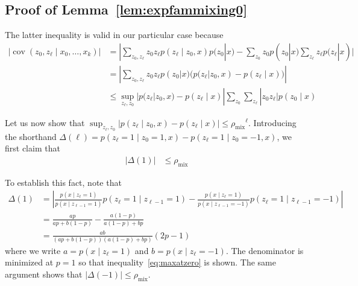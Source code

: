 \documentclass[twoside,11pt]{article}
\DeclareMathOperator{\cov}{cov}
\newcommand{\mixcoef}{\ensuremath{\rho_{\mathrm{mix}}}}
\begin{document}

\subsection{Proof of Lemma~\ref{lem:expfammixing0}}
\label{sec:expfammixing}


The latter inequality is valid in our particular case because
\begin{align*}
|\cov (z_0, z_{\ell} \mid x_0,\dots, x_k)| &= |\sum_{z_0, z_{\ell}}
z_0 z_{\ell} p(z_{\ell} \mid z_0,x) p(z_0|x) - \sum_{z_0} z_0 p(z_0|x)
\sum_{z_{\ell}} z_{\ell} p(z_{\ell}|x)| \\
%
&= | \sum_{z_0, z_{\ell}} z_0 z_{\ell} p(z_0|x) (p(z_{\ell}|z_0,x) -
p(z_{\ell} \mid x))| \\ 
%
& \leq \sup_{z_{\ell},z_0} |p(z_{\ell}|z_0,x) - p(z_{\ell} \mid x)|
\sum_{z_0} \sum_{z_{\ell}} |z_0 z_{\ell}| p(z_0 \mid x)
\end{align*}

Let us now show that $\sup_{z_{\ell},z_0} \big| p(z_{\ell} \mid z_0,x)
- p(z_{\ell} \mid x) \big| \leq \mixcoef^{\ell}$.  Introducing the
shorthand $\Delta(\ell) = p(z_{\ell} = 1 \mid z_{0} = 1, x) -
p(z_{\ell} = 1 \mid z_0 =-1, x)$, we first claim that
\begin{align}
\label{eq:maxatzero} 
|\Delta(1)| & \leq \mixcoef
\end{align}

To establish this fact, note that 
\begin{align*}
\Delta(1) & = \left| \frac{p(x \mid z_{\ell} =1) }{p(x
  \mid z_{\ell-1}=1)} p(z_{\ell} =1 \mid z_{\ell-1}=1) -
\frac{p(x \mid z_{\ell}=1)}{p(x \mid z_{\ell-1}= -1)}
p(z_{\ell} = 1 \mid z_{\ell-1} = -1) \right| \\
%
& = \frac{ap}{ap + b(1-p)} -\frac{a(1-p)}{a(1-p)+bp} \\
%
& = \frac{ab}{(ap + b(1-p))(a(1-p)+bp)} (2p-1)
\end{align*}
where we write $a = p( x \mid z_{\ell}=1)$ and $b = p(x \mid z_{\ell}= -1)$.
The denominator is minimized at $p=1$ so that
inequality~\eqref{eq:maxatzero} is shown.  The same argument shows
that $|\Delta(-1)| \leq \mixcoef$.
\end{document}
